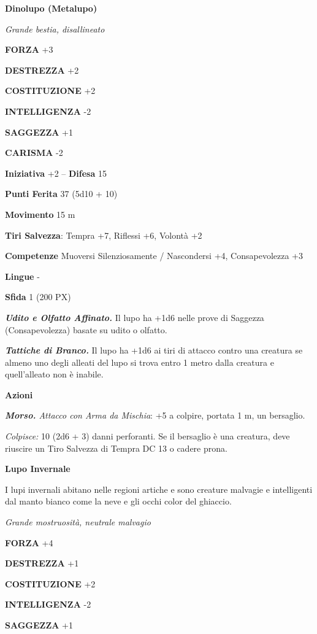 \begin{multicols}{2}
\medskip\textbf{Dinolupo (Metalupo)}

\textit{Grande bestia, disallineato}

\textbf{FORZA} +3

\textbf{DESTREZZA} +2

\textbf{COSTITUZIONE} +2

\textbf{INTELLIGENZA} -2

\textbf{SAGGEZZA} +1

\textbf{CARISMA} -2

\textbf{Iniziativa} +2 -- \textbf{Difesa} 15

\textbf{Punti Ferita} 37 (5d10 + 10)

\textbf{Movimento} 15 m

\textbf{Tiri Salvezza}: Tempra +7, Riflessi +6, Volontà +2

\textbf{Competenze} Muoversi Silenziosamente / Nascondersi +4, Consapevolezza +3

\textbf{Lingue} -

\textbf{Sfida} 1 (200 PX)

\textit{\textbf{Udito e Olfatto Affinato.}} Il lupo ha +1d6 nelle prove di Saggezza (Consapevolezza) basate su udito o olfatto.

\textit{\textbf{Tattiche di Branco.}} Il lupo ha +1d6 ai tiri di attacco contro una creatura se almeno uno degli alleati del lupo si trova entro 1 metro dalla creatura e quell'alleato non è inabile.

\textbf{Azioni}

\textit{\textbf{Morso.} Attacco con Arma da Mischia}: +5 a colpire, portata 1 m, un bersaglio.

\textit{Colpisce:} 10 (2d6 + 3) danni perforanti. Se il bersaglio è una creatura, deve riuscire un Tiro Salvezza di Tempra DC 13 o cadere prona.

\medskip\textbf{Lupo Invernale}

I lupi invernali abitano nelle regioni artiche e sono creature malvagie e intelligenti dal manto bianco come la neve e gli occhi color del ghiaccio.

\textit{Grande mostruosità, neutrale malvagio}

\textbf{FORZA} +4

\textbf{DESTREZZA} +1

\textbf{COSTITUZIONE} +2

\textbf{INTELLIGENZA} -2

\textbf{SAGGEZZA} +1


\end{multicols}

